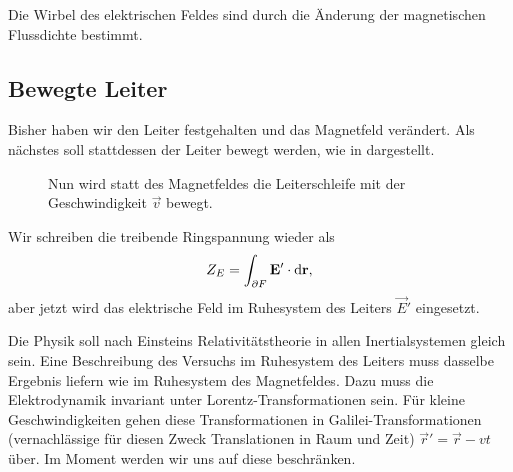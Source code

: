 \begin{formal}
	Die Wirbel des elektrischen Feldes sind durch die Änderung der magnetischen Flussdichte bestimmt.
\end{formal}


\subsection{Bewegte Leiter}

Bisher haben wir den Leiter festgehalten und das Magnetfeld verändert. Als nächstes soll stattdessen der Leiter bewegt werden, wie in  dargestellt.

\begin{figure}[ht]
	\centering
	\tfigInductionB
	\caption{Nun wird statt des Magnetfeldes die Leiterschleife mit der Geschwindigkeit $\vec v$ bewegt. }
	\label{fig:inductionB}
\end{figure}

Wir schreiben die treibende Ringspannung wieder als
\begin{equation}
	\label{eq:ringspannung_ruhesystem_leiter}
	Z_{E}=\int _{\partial F}\mathbf{E}'\cdot \mathop{}\!\mathrm{d} \mathbf{r},
\end{equation}
aber jetzt wird das elektrische Feld im Ruhesystem des Leiters $\vec {E}'$ eingesetzt.

Die Physik soll nach Einsteins Relativitätstheorie in allen Inertialsystemen gleich sein. Eine Beschreibung des Versuchs im Ruhesystem des Leiters muss dasselbe Ergebnis liefern wie im Ruhesystem des Magnetfeldes. Dazu muss die Elektrodynamik invariant unter Lorentz-Transformationen sein. Für kleine Geschwindigkeiten gehen diese Transformationen in Galilei-Transformationen (vernachlässige für diesen Zweck Translationen in Raum und Zeit) $\vec {r}'=\vec {r}-vt$ über. Im Moment werden wir uns auf diese beschränken.

